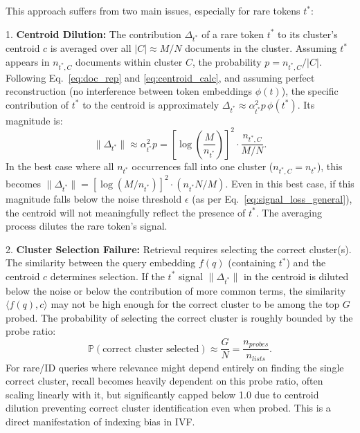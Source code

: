 \documentclass[manuscript]{acmart}
\begin{document}
This approach suffers from two main issues, especially for rare tokens $t^*$:

1.  \textbf{Centroid Dilution:} The contribution $\Delta_{t^*}$ of a rare token $t^*$ to its cluster's centroid $c$ is averaged over all $|C| \approx M/N$ documents in the cluster. Assuming $t^*$ appears in $n_{t^*,C}$ documents within cluster $C$, the probability $p = n_{t^*,C} / |C|$. Following Eq.~\ref{eq:doc_rep} and \ref{eq:centroid_calc}, and assuming perfect reconstruction (no interference between token embeddings $\phi(t)$), the specific contribution of $t^*$ to the centroid is approximately $\Delta_{t^*} \approx \alpha_{t^*}^2 p \, \phi(t^*)$. Its magnitude is:
    \begin{equation}
    \|\Delta_{t^*}\| \approx \alpha_{t^*}^2 p = \left[\log\!\left(\frac{M}{n_{t^*}}\right)\right]^2 \cdot \frac{n_{t^*,C}}{M/N}. \label{eq:centroid_signal_mag}
    \end{equation}
    In the best case where all $n_{t^*}$ occurrences fall into one cluster ($n_{t^*,C} = n_{t^*}$), this becomes $\|\Delta_{t^*}\| = [\log(M/n_{t^*})]^2 \cdot (n_{t^*} N / M)$. Even in this best case, if this magnitude falls below the noise threshold $\epsilon$ (as per Eq.~\ref{eq:signal_loss_general}), the centroid will not meaningfully reflect the presence of $t^*$. The averaging process dilutes the rare token's signal.

2.  \textbf{Cluster Selection Failure:} Retrieval requires selecting the correct cluster(s). The similarity between the query embedding $f(q)$ (containing $t^*$) and the centroid $c$ determines selection. If the $t^*$ signal $\|\Delta_{t^*}\|$ in the centroid is diluted below the noise or below the contribution of more common terms, the similarity $\langle f(q), c \rangle$ may not be high enough for the correct cluster to be among the top $G$ probed. The probability of selecting the correct cluster is roughly bounded by the probe ratio:
    \begin{equation}
    \mathbb{P}(\text{correct cluster selected}) \approx \frac{G}{N} = \frac{n_{probes}}{n_{lists}}. \label{eq:ivf_probe_prob}
    \end{equation}
    For rare/ID queries where relevance might depend entirely on finding the single correct cluster, recall becomes heavily dependent on this probe ratio, often scaling linearly with it, but significantly capped below 1.0 due to centroid dilution preventing correct cluster identification even when probed. This is a direct manifestation of indexing bias in IVF.
\end{document}

